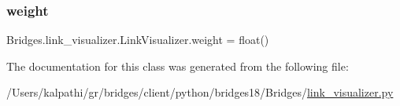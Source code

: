 \mbox{\label{class_bridges_1_1link__visualizer_1_1_link_visualizer_a3cf821801816ca20db68e8122b159e96}} 
\subsubsection{\texorpdfstring{weight}{weight}}
{\footnotesize\ttfamily Bridges.\+link\+\_\+visualizer.\+Link\+Visualizer.\+weight = float()\hspace{0.3cm}{\ttfamily [static]}}



The documentation for this class was generated from the following file\+:\begin{DoxyCompactItemize}
\item 
/\+Users/kalpathi/gr/bridges/client/python/bridges18/\+Bridges/\mbox{\hyperlink{link__visualizer_8py}{link\+\_\+visualizer.\+py}}\end{DoxyCompactItemize}

